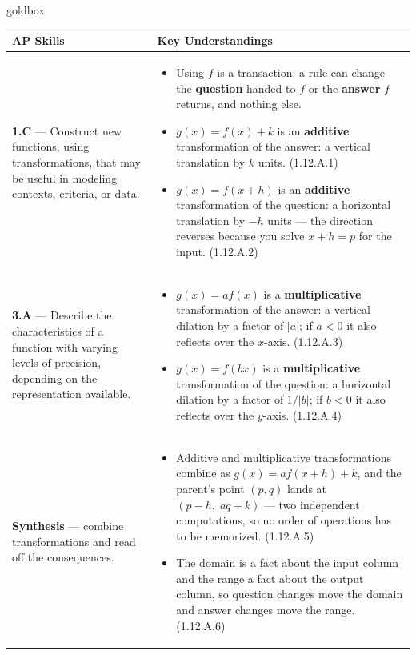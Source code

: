 \documentclass[10pt]{article}
\begin{document}
\renewcommand{\arraystretch}{1.6}
\begin{skillbox}{goldbox}
\begin{tabularx}{\linewidth}{@{}X X@{}}
\textbf{AP Skills} &
\textbf{Key Understandings} \\
\midrule
\textbf{1.C} --- Construct new functions, using transformations, that may be
useful in modeling contexts, criteria, or data. &
\begin{itemize}[leftmargin=1.2em,itemsep=2pt,topsep=0pt]
  \item Using $f$ is a transaction: a rule can change the \textbf{question}
        handed to $f$ or the \textbf{answer} $f$ returns, and nothing else.
  \item $g(x)=f(x)+k$ is an \textbf{additive} transformation of the answer: a
        vertical translation by $k$ units. (1.12.A.1)
  \item $g(x)=f(x+h)$ is an \textbf{additive} transformation of the question:
        a horizontal translation by $-h$ units --- the direction reverses
        because you solve $x+h=p$ for the input. (1.12.A.2)
\end{itemize} \\
\textbf{3.A} --- Describe the characteristics of a function with varying levels
of precision, depending on the representation available. &
\begin{itemize}[leftmargin=1.2em,itemsep=2pt,topsep=0pt]
  \item $g(x)=af(x)$ is a \textbf{multiplicative} transformation of the
        answer: a vertical dilation by a factor of $|a|$; if $a<0$ it also
        reflects over the $x$-axis. (1.12.A.3)
  \item $g(x)=f(bx)$ is a \textbf{multiplicative} transformation of the
        question: a horizontal dilation by a factor of $1/|b|$; if $b<0$ it
        also reflects over the $y$-axis. (1.12.A.4)
\end{itemize} \\
\textbf{Synthesis} --- combine transformations and read off the consequences. &
\begin{itemize}[leftmargin=1.2em,itemsep=2pt,topsep=0pt]
  \item Additive and multiplicative transformations combine as
        $g(x)=af(x+h)+k$, and the parent's point $(p,q)$ lands at
        $(p-h,\;aq+k)$ --- two independent computations, so no order of
        operations has to be memorized. (1.12.A.5)
  \item The domain is a fact about the input column and the range a fact
        about the output column, so question changes move the domain and
        answer changes move the range. (1.12.A.6)
\end{itemize} \\
\end{tabularx}
\end{skillbox}
\end{document}
